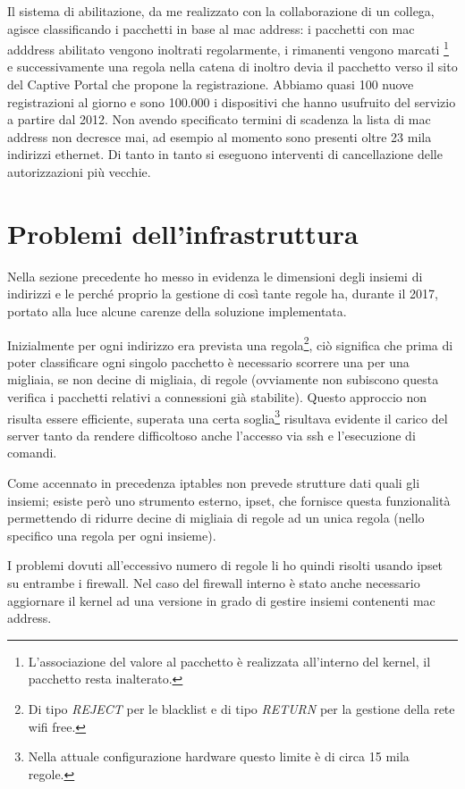 Il sistema di abilitazione, da me realizzato con la collaborazione di un collega, agisce
classificando i pacchetti in base al mac address: i pacchetti con mac adddress
abilitato vengono inoltrati regolarmente, i rimanenti vengono marcati%
\footnote{L'associazione del valore al pacchetto è realizzata all'interno del kernel,
il pacchetto resta inalterato.} e successivamente una regola nella catena di
inoltro devia il pacchetto verso il sito del Captive Portal che propone la
registrazione.
Abbiamo quasi 100 nuove registrazioni al giorno e sono 100.000 i dispositivi
che hanno usufruito del servizio a partire dal 2012.  Non avendo specificato
termini di scadenza la lista di mac address non decresce mai, ad esempio al
momento sono presenti oltre 23 mila indirizzi ethernet.  Di tanto in tanto si
eseguono interventi di cancellazione delle autorizzazioni pi\`u vecchie.

\section{Problemi dell'infrastruttura}

Nella sezione precedente ho messo in evidenza le dimensioni degli insiemi di
indirizzi e le perché proprio la gestione di così tante regole ha, durante il
2017, portato alla luce alcune carenze della soluzione implementata.

Inizialmente per ogni indirizzo era prevista una regola\footnote{Di tipo {\em
REJECT} per le blacklist e di tipo {\em RETURN} per la gestione della rete wifi
free.}, ciò significa che prima di poter classificare ogni singolo pacchetto
\`e necessario scorrere una per una migliaia, se non decine di migliaia, di
regole (ovviamente non subiscono questa verifica i pacchetti relativi a
connessioni gi\`a stabilite).  Questo approccio non risulta essere efficiente,
superata una certa soglia\footnote{Nella attuale configurazione hardware
questo limite \`e di circa 15 mila regole.}
risultava evidente il carico del server tanto da rendere difficoltoso anche
l'accesso via ssh e l'esecuzione di comandi.

Come accennato in precedenza iptables non prevede strutture dati quali gli
insiemi; esiste per\`o uno strumento esterno, ipset, che fornisce questa
funzionalità permettendo di ridurre decine di migliaia di regole ad un unica
regola (nello specifico una regola per ogni insieme).

I problemi dovuti all'eccessivo numero di regole li ho quindi risolti usando
ipset su entrambe i firewall.  Nel caso del firewall interno è stato anche
necessario aggiornare il kernel ad una versione in grado di gestire insiemi
contenenti mac address.

